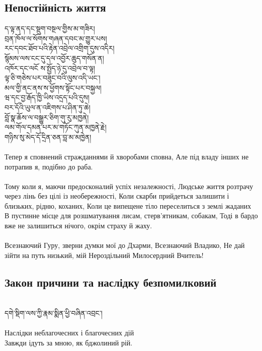 \subsection{Непостійність життя}
\ti
ད་ལྟ་ནད་དང་སྡུག་བསྔལ་གྱིས་མ་གཟིར།\\
བྲན་ཁོལ་ལ་སོགས་གཞན་དབང་མ་གྱུར་པས།\\
རང་དབང་ཐོབ་པའི་རྟེན་འབྲེལ་འགྲིག་དུས་འདིར།\\
སྙོམས་ལས་ངང་དུ་དལ་འབྱོར་ཆུད་གསོན་ན།\\
འཁོར་དང་ལངོ ས་སྤྱོད་ཉེ་དུ་འབྲེལ་བ་ལྟ།\\
ལྟ་ཅི་གཅེས་པར་བཟུང་བའི་ལུས་འདི་ཡང་།\\
མལ་གྱི་ནང་ནས་ས་ཕྱོགས་སྟོང་པར་བསྐྱལ།\\
ཝ་དང་བྱ་རྒོད་ཁྱི་ཡིས་འདྲད་པའི་དུས།\\
བར་དོའི་ཡུལ་ན་འཇིགས་པ་ཤིན་ཏུ་ཆེ།\\
བློ་སྣ་ཆོས་ལ་བསྒྱུར་ཅིག་གུ་རུ་མཁྱནེ།\\
ལམ་གོལ་དམན་པར་མ་གཏོང་ཀུན་མཁྱནེ་རྗེ།\\
གཉིས་སུ་མེད་དོ་དྲིན་ཅན་བླ་མ་མཁྱེན།\\
\\
\ru
Тепер я сповнений стражданнями й хворобами сповна,
Але під владу інших не потрапив я, подібно до раба.\\
\\
Тому коли я, маючи предосконалий успіх незалежності,
Людське життя розтрачу через лінь без цілі із необережності,
Коли скарби прийдеться залишити і близьких, рідню, коханих,
Коли це випещене тіло переселиться з землі жаданих
В пустинне місце для розшматування лисам, стерв'ятникам, собакам,
Тоді в бардо вже не залишиться нічого, окрім страху й жаху.\\
\\
Всезнаючий Гуру, зверни думки мої до Дхарми, Всезнаючий Владико,
Не дай зійти на путь низький, мій Нероздільний Милосердний Вчитель!\\

\newpage
\subsection{Закон причини та наслідку безпомилковий}
\\
\ti
དགེ་སྡིག་ལས་ཀྱི་རྣམ་སྨིན་ཕྱི་བཞིན་འབྲང་།\\
\\
\ru
Наслідки неблагочесних і благочесних дій\\
Завжди ідуть за мною, як бджолиний рій.\\

